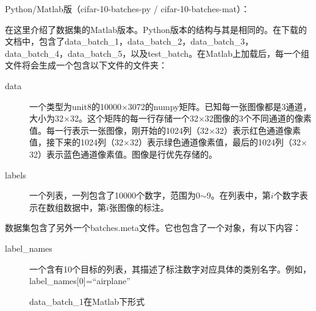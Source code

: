 {\color{blue} Python/Matlab版（cifar-10-batches-py / cifar-10-batches-mat）：}

在这里介绍了数据集的Matlab版本。Python版本的结构与其是相同的。在下载的文档中，包含了{\scriptsize{data\_batch\_1}}，{\scriptsize{data\_batch\_2}}，{\scriptsize{data\_batch\_3}}，{\scriptsize{data\_batch\_4}}，{\scriptsize{data\_batch\_5}}，以及{\scriptsize{test\_batch}}。在Matlab上加载后，每一个组文件将会生成一个包含以下文件的文件夹：%

\begin{comment}
\begin{python}
def unpickle(file)
  Import cPickle
  fo=open(file,'rb')
  dict=cPickle.load(fo)
  fo.close()
  return dict
\end{python} 
\end{comment}


\begin{description}
\item[data] 一个类型为unit8的10000$\times$3072的numpy矩阵。已知每一张图像都是3通道，大小为32$\times$32。这个矩阵的每一行存储一个32$\times$32图像的3个不同通道的像素值。每一行表示一张图像，刚开始的1024列（32$\times$32）表示红色通道像素值，接下来的1024列（32$\times$32）表示绿色通道像素值，最后的1024列（32$\times$32）表示蓝色通道像素值。图像是行优先存储的。%
\item[labels] 一个列表，一列包含了10000个数字，范围为0$\sim$9。在列表中，第$i$个数字表示在数组数据中，第$i$张图像的标注。
\end{description}

数据集包含了另外一个{\scriptsize{batches.meta}}文件。它也包含了一个对象，有以下内容：
\begin{description}
\item[label\_names] 一个含有10个目标的列表，其描述了标注数字对应具体的类别名字。例如，label\_names[0]=``airplane''
\end{description}


\begin{figure}[!ht]
  \centering 
  \caption{data\_batch\_1在Matlab下形式}
\end{figure}


